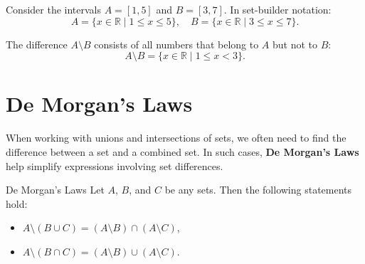 \begin{example}
    Consider the intervals \( A = \left[1, 5\right] \) and \( B = \left[3, 7\right] \). In set-builder notation:  
    \[
    A = \{x \in \mathbb{R} \mid 1 \leq x \leq 5\}, \quad B = \{x \in \mathbb{R} \mid 3 \leq x \leq 7\}.
    \]
    
    The difference \( A \setminus B \) consists of all numbers that belong to \( A \) but not to \( B \):  
    \[
    A \setminus B = \{x \in \mathbb{R} \mid 1 \leq x < 3\}.
    \]
\end{example}

\section{De Morgan's Laws}

When working with unions and intersections of sets, we often need to find the difference between a set and a combined set. In such cases, \textbf{De Morgan's Laws} help simplify expressions involving set differences.

\begin{theorembox}{De Morgan's Laws}
Let \( A \), \( B \), and \( C \) be any sets. Then the following statements hold:
    \begin{itemize}
    \item \( A \setminus (B \cup C) = (A \setminus B) \cap (A \setminus C) \),
    \item \( A \setminus (B \cap C) = (A \setminus B) \cup (A \setminus C) \).
    \end{itemize}
\end{theorembox}

